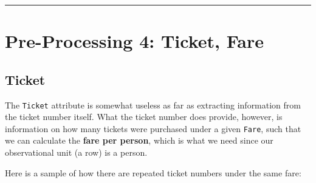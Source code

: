 \documentclass[]{article}
\newenvironment{Shaded}{\begin{snugshade}}{\end{snugshade}}
\newcommand{\KeywordTok}[1]{\textcolor[rgb]{0.13,0.29,0.53}{\textbf{#1}}}
\newcommand{\DecValTok}[1]{\textcolor[rgb]{0.00,0.00,0.81}{#1}}
\newcommand{\StringTok}[1]{\textcolor[rgb]{0.31,0.60,0.02}{#1}}
\newcommand{\CommentTok}[1]{\textcolor[rgb]{0.56,0.35,0.01}{\textit{#1}}}
\newcommand{\OtherTok}[1]{\textcolor[rgb]{0.56,0.35,0.01}{#1}}
\newcommand{\OperatorTok}[1]{\textcolor[rgb]{0.81,0.36,0.00}{\textbf{#1}}}
\newcommand{\NormalTok}[1]{#1}
\begin{document}
\begin{Shaded}
\end{Shaded}

\begin{center}\rule{0.5\linewidth}{\linethickness}\end{center}

\hypertarget{preprocess4-link}{\section{Pre-Processing 4: Ticket,
Fare}\label{preprocess4-link}}

\subsection{Ticket}\label{ticket}

The \texttt{Ticket} attribute is somewhat useless as far as extracting
information from the ticket number itself. What the ticket number does
provide, however, is information on how many tickets were purchased
under a given \texttt{Fare}, such that we can calculate the \textbf{fare
per person}, which is what we need since our observational unit (a row)
is a person.

Here is a sample of how there are repeated ticket numbers under the same
fare:

\begin{Shaded}
\end{Shaded}
\end{document}
